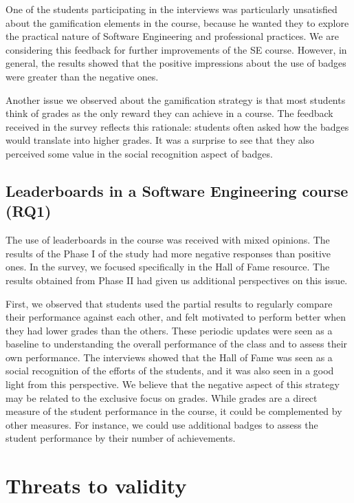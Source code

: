 One of the students participating in the interviews was particularly unsatisfied about the gamification elements in the course, because he wanted they to explore the practical nature of Software Engineering and professional practices. We are considering this feedback for further improvements of the SE course. However, in general, the results showed that the positive impressions about the use of badges were greater than the negative ones.

Another issue we observed about the gamification strategy is that most students think of grades as the only reward they can achieve in a course. The feedback received in the survey reflects this rationale: students often asked how the badges would translate into higher grades. It was a surprise to see that they also perceived some value in the social recognition aspect of badges.

\subsection{Leaderboards in a Software Engineering course (RQ1)}

The use of leaderboards in the course was received with mixed opinions. The results of the Phase I of the study had more negative responses than positive ones. In the survey, we focused specifically in the Hall of Fame resource. The results obtained from Phase II had given us additional perspectives on this issue.

First, we observed that students used the partial results to regularly compare their performance against each other, and felt motivated to perform better when they had lower grades than the others. These periodic updates were seen as a baseline to understanding the overall performance of the class and to assess their own performance. The interviews showed that the Hall of Fame was seen as a social recognition of the efforts of the students, and it was also seen in a good light from this perspective. We believe that the negative aspect of this strategy may be related to the exclusive focus on grades. While grades are a direct measure of the student performance in the course, it could be complemented by other measures. For instance, we could use additional badges to assess the student performance by their number of achievements.

\section{Threats to validity}

